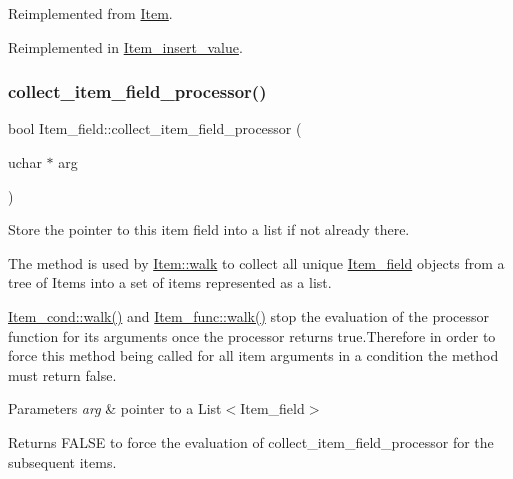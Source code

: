 Reimplemented from \mbox{\hyperlink{classItem_af75e3659f732265cbe72824803f208f2}{Item}}.



Reimplemented in \mbox{\hyperlink{classItem__insert__value_a6c64934ac5862b0e211f15e347a0a940}{Item\+\_\+insert\+\_\+value}}.

\mbox{\label{classItem__field_aa44b1b1e7f82487a0e6ea0f3c777d221}} 
\subsubsection{\texorpdfstring{collect\+\_\+item\+\_\+field\+\_\+processor()}{collect\_item\_field\_processor()}}
{\footnotesize\ttfamily bool Item\+\_\+field\+::collect\+\_\+item\+\_\+field\+\_\+processor (\begin{DoxyParamCaption}\item[{uchar $\ast$}]{arg }\end{DoxyParamCaption})\hspace{0.3cm}{\ttfamily [virtual]}}

Store the pointer to this item field into a list if not already there.

The method is used by \mbox{\hyperlink{classItem_ab7d2529511c14a77e59a1b1bbabc95d7}{Item\+::walk}} to collect all unique \mbox{\hyperlink{classItem__field}{Item\+\_\+field}} objects from a tree of Items into a set of items represented as a list.

\mbox{\hyperlink{classItem__cond_a6e601f5a22e1625a703c0183a67eca2a}{Item\+\_\+cond\+::walk()}} and \mbox{\hyperlink{classItem__func_af98acc318ebbc106d047a1589884f0ff}{Item\+\_\+func\+::walk()}} stop the evaluation of the processor function for its arguments once the processor returns true.\+Therefore in order to force this method being called for all item arguments in a condition the method must return false.


\begin{DoxyParams}{Parameters}
{\em arg} & pointer to a List$<$\+Item\+\_\+field$>$\\
\hline
\end{DoxyParams}
\begin{DoxyReturn}{Returns}
F\+A\+L\+SE to force the evaluation of collect\+\_\+item\+\_\+field\+\_\+processor for the subsequent items. 
\end{DoxyReturn}


